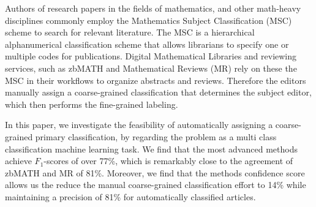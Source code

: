 Authors of research papers in the fields of mathematics, and other math-heavy disciplines commonly employ the Mathematics Subject Classification (MSC) scheme to search for relevant literature.
The MSC is a hierarchical alphanumerical classification scheme that allows librarians to specify one or multiple codes for publications.
Digital Mathematical Libraries and reviewing services, such as zbMATH and Mathematical Reviews (MR) rely on these the MSC in their workflows to organize abstracts and reviews.
Therefore the editors manually assign a coarse-grained classification that determines the subject editor, which then performs the fine-grained labeling.

In this paper, we investigate the feasibility of automatically assigning a coarse-grained primary classification, by regarding the problem as a multi class classification machine learning task.
We find that the most advanced methods achieve \(F_{1}\)-scores of over 77\%, which is remarkably close to the agreement of zbMATH and MR of 81\%.
Moreover, we find that the methods confidence score allows us the reduce the manual coarse-grained classification effort to 14\% while maintaining a precision of 81\% for automatically classified articles.